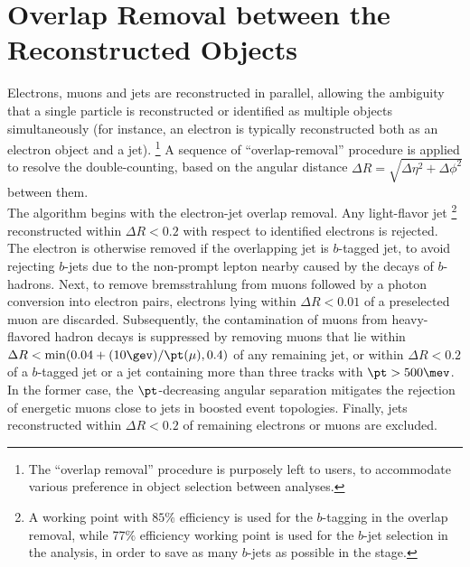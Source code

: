 





\clearpage
\section{Overlap Removal between the Reconstructed Objects} \label{sec::objDef::OR}
Electrons, muons and jets are reconstructed in parallel, 
allowing the ambiguity that a single particle is reconstructed or identified as multiple objects simultaneously (for instance, an electron is typically reconstructed both as an electron object and a jet). 
\footnote{The ``overlap removal'' procedure is purposely left to users, to accommodate various preference in object selection between analyses.}
A sequence of ``overlap-removal'' procedure is applied to resolve the double-counting, based on the angular distance $\Delta R = \sqrt{\Delta\eta^2+\Delta\phi^2}$ between them. \\
 
The algorithm begins with the electron-jet overlap removal.
Any light-flavor jet \footnote{A working point with $85\%$ efficiency is used for the $b$-tagging in the overlap removal, while 77$\%$ efficiency working point is used for the $b$-jet selection in the analysis, in order to save as many $b$-jets as possible in the stage.} 
reconstructed within $\Delta R < 0.2$ with respect to identified electrons is rejected.
The electron is otherwise removed if the overlapping jet is $b$-tagged jet, 
to avoid rejecting $b$-jets due to the non-prompt lepton nearby caused by the decays of $b$-hadrons. Next, to remove bremsstrahlung from muons followed by a photon conversion into electron pairs, electrons lying within $\Delta R < 0.01$ of a preselected muon are discarded.  
%
Subsequently, the contamination of muons from heavy-flavored hadron decays is suppressed by removing muons that lie within $\Delta R < \min(0.04 + (10 \gev)/\pt(\mu), 0.4)$ of any remaining jet, or within $\Delta R < 0.2$ of a $b$-tagged jet or a jet containing more than three tracks with $\pt > 500 \mev$.
In the former case, the $\pt$-decreasing angular separation mitigates the rejection of energetic muons close to jets in boosted event topologies. Finally, jets reconstructed within $\Delta R < 0.2$ of remaining electrons or muons are excluded. \\

